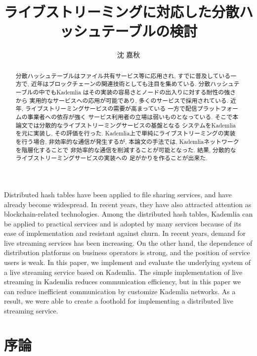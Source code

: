 \documentclass[sotsuron]{jcsie}
\title{ライブストリーミングに対応した分散ハッシュテーブルの検討}
\author{沈 嘉秋}
\begin{document}
\maketitle
\emaketitle
{}
\begin{abstract}    
分散ハッシュテーブルはファイル共有サービス等に応用され, 
すでに普及している一方で, 
近年はブロックチェーンの関連技術としても注目を集めている.
%
分散ハッシュテーブルの中でもKademlia
はその実装の容易さとノードの出入りに対する耐性の強さから
実用的なサービスへの応用が可能であり, 
多くのサービスで採用されている.
%
近年, ライブストリーミングサービスの需要が高まっている
一方で配信プラットフォームの事業者への依存が強く
サービス利用者の立場は弱いものとなっている.
そこで本論文では分散的なライブストリーミングサービスの基盤となる
システムをKademliaを元に実装し, その評価を行った.
%
Kademlia上で単純にライブストリーミングの実装を行う場合, 
非効率的な通信が発生するが, 本論文の手法では, 
Kademliaネットワークを階層化することで
非効率的な通信を削減することが可能となった.
%
結果, 分散的なライブストリーミングサービスの実装への
足がかりを作ることが出来た.
\end{abstract}
\begin{eabstract}
Distributed hash tables have been applied to file sharing services, 
and have already become widespread.
In recent years, they have also attracted attention as 
blockchain-related technologies.
%
Among the distributed hash tables, 
Kademlia can be applied to practical services 
and is adopted by many services 
because of its ease of implementation and resistant against churn.
%
In recent years, demand for live streaming services has been increasing.
On the other hand,
the dependence of distribution platforms on business operators is strong, 
and the position of service users is weak.
%
In this paper, we implement and evaluate the underlying system 
of a live streaming service based on Kademlia.
%
The simple implementation of live streaming in 
Kademlia reduces communication efficiency, 
but in this paper we can reduce inefficient communication by 
customize Kademlia networks.
%
As a result, we were able to create a foothold for implementing 
a distributed live streaming service.
\end{eabstract}
\setcounter{tocdepth}{2}
\tableofcontents
{}


\chapter{序論}
\end{document}
